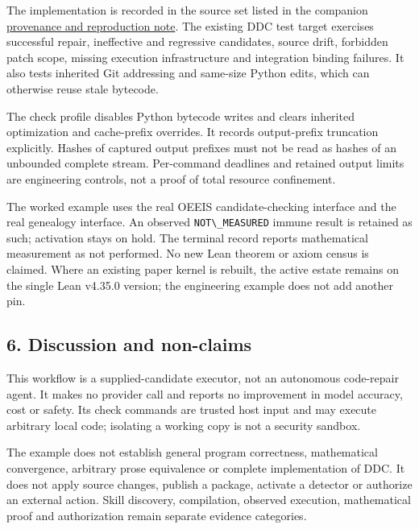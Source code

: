 \documentclass[
  11pt,
]{article}
\newcommand{\passthrough}[1]{#1}
\begin{document}
The implementation is recorded in the source set listed in the companion
\href{https://github.com/dbccpage/the_symbol_game/blob/main/atlas/coda_atlas/F004_papers/015_pfp/028_pfp_operadic_composition_and_bounded_ddc_repair/docs/reproduction.md}{provenance
and reproduction note}. The existing DDC test target exercises
successful repair, ineffective and regressive candidates, source drift,
forbidden patch scope, missing execution infrastructure and integration
binding failures. It also tests inherited Git addressing and same-size
Python edits, which can otherwise reuse stale bytecode.

The check profile disables Python bytecode writes and clears inherited
optimization and cache-prefix overrides. It records output-prefix
truncation explicitly. Hashes of captured output prefixes must not be
read as hashes of an unbounded complete stream. Per-command deadlines
and retained output limits are engineering controls, not a proof of
total resource confinement.

The worked example uses the real OEEIS candidate-checking interface and
the real genealogy interface. An observed
\passthrough{\lstinline!NOT\_MEASURED!} immune result is retained as
such; activation stays on hold. The terminal record reports mathematical
measurement as not performed. No new Lean theorem or axiom census is
claimed. Where an existing paper kernel is rebuilt, the active estate
remains on the single Lean v4.35.0 version; the engineering example does
not add another pin.

\subsection{6. Discussion and
non-claims}\label{discussion-and-non-claims}

This workflow is a supplied-candidate executor, not an autonomous
code-repair agent. It makes no provider call and reports no improvement
in model accuracy, cost or safety. Its check commands are trusted host
input and may execute arbitrary local code; isolating a working copy is
not a security sandbox.

The example does not establish general program correctness, mathematical
convergence, arbitrary prose equivalence or complete implementation of
DDC. It does not apply source changes, publish a package, activate a
detector or authorize an external action. Skill discovery, compilation,
observed execution, mathematical proof and authorization remain separate
evidence categories.
\end{document}

